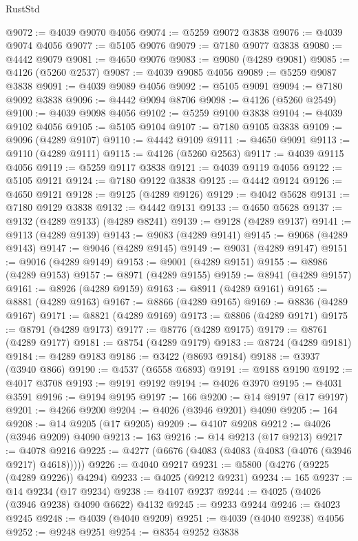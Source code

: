 \begin{lexlean}{RustStd}
\begin{coremodule}
@9072 := @4039 @9070 @4056
@9074 := @5259 @9072 @3838
@9076 := @4039 @9074 @4056
@9077 := @5105 @9076
@9079 := @7180 @9077 @3838
@9080 := @4442 @9079
@9081 := @4650 @9076
@9083 := @9080 (@4289 @9081)
@9085 := @4126 (@5260 @2537)
@9087 := @4039 @9085 @4056
@9089 := @5259 @9087 @3838
@9091 := @4039 @9089 @4056
@9092 := @5105 @9091
@9094 := @7180 @9092 @3838
@9096 := @4442 @9094 @8706
@9098 := @4126 (@5260 @2549)
@9100 := @4039 @9098 @4056
@9102 := @5259 @9100 @3838
@9104 := @4039 @9102 @4056
@9105 := @5105 @9104
@9107 := @7180 @9105 @3838
@9109 := @9096 (@4289 @9107)
@9110 := @4442 @9109
@9111 := @4650 @9091
@9113 := @9110 (@4289 @9111)
@9115 := @4126 (@5260 @2563)
@9117 := @4039 @9115 @4056
@9119 := @5259 @9117 @3838
@9121 := @4039 @9119 @4056
@9122 := @5105 @9121
@9124 := @7180 @9122 @3838
@9125 := @4442 @9124
@9126 := @4650 @9121
@9128 := @9125 (@4289 @9126)
@9129 := @4042 @5628
@9131 := @7180 @9129 @3838
@9132 := @4442 @9131
@9133 := @4650 @5628
@9137 := @9132 (@4289 @9133) (@4289 @8241)
@9139 := @9128 (@4289 @9137)
@9141 := @9113 (@4289 @9139)
@9143 := @9083 (@4289 @9141)
@9145 := @9068 (@4289 @9143)
@9147 := @9046 (@4289 @9145)
@9149 := @9031 (@4289 @9147)
@9151 := @9016 (@4289 @9149)
@9153 := @9001 (@4289 @9151)
@9155 := @8986 (@4289 @9153)
@9157 := @8971 (@4289 @9155)
@9159 := @8941 (@4289 @9157)
@9161 := @8926 (@4289 @9159)
@9163 := @8911 (@4289 @9161)
@9165 := @8881 (@4289 @9163)
@9167 := @8866 (@4289 @9165)
@9169 := @8836 (@4289 @9167)
@9171 := @8821 (@4289 @9169)
@9173 := @8806 (@4289 @9171)
@9175 := @8791 (@4289 @9173)
@9177 := @8776 (@4289 @9175)
@9179 := @8761 (@4289 @9177)
@9181 := @8754 (@4289 @9179)
@9183 := @8724 (@4289 @9181)
@9184 := @4289 @9183
@9186 := @3422 (@8693 @9184)
@9188 := @3937 (@3940 @866)
@9190 := @4537 (@6558 @6893)
@9191 := @9188 @9190
@9192 := @4017 @3708
@9193 := @9191 @9192
@9194 := @4026 @3970
@9195 := @4031 @3591
@9196 := @9194 @9195
@9197 := 166
@9200 := @14 @9197 (@17 @9197)
@9201 := @4266 @9200
@9204 := @4026 (@3946 @9201) @4090
@9205 := 164
@9208 := @14 @9205 (@17 @9205)
@9209 := @4107 @9208
@9212 := @4026 (@3946 @9209) @4090
@9213 := 163
@9216 := @14 @9213 (@17 @9213)
@9217 := @4078 @9216
@9225 := @4277 (@6676 (@4083 (@4083 (@4083 (@4076 (@3946 @9217) @4618)))))
@9226 := @4040 @9217
@9231 := @5800 (@4276 (@9225 (@4289 @9226)) @4294)
@9233 := @4025 (@9212 @9231)
@9234 := 165
@9237 := @14 @9234 (@17 @9234)
@9238 := @4107 @9237
@9244 := @4025 (@4026 (@3946 @9238) @4090 @6622) @4132
@9245 := @9233 @9244
@9246 := @4023 @9245
@9248 := @4039 (@4040 @9209)
@9251 := @4039 (@4040 @9238) @4056
@9252 := @9248 @9251
@9254 := @8354 @9252 @3838

\end{coremodule}
\end{lexlean}
